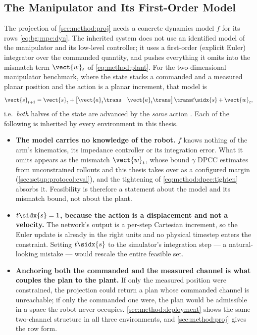 \subsection{The Manipulator and Its First-Order Model}\label{sec:method:manipulator}

The projection of \autoref{sec:method:proj} needs a concrete dynamics model $f$ for its rows
\eqref{eq:bg:mpc:dyn}. The inherited system does not use an identified
model of the manipulator and its low-level controller; it uses a first-order (explicit Euler)
integrator over the commanded quantity, and pushes everything it omits into the mismatch term
$\vect{w}_{t}$ of \eqref{eq:method:plant}. For the two-dimensional manipulator benchmark, where the
state stacks a commanded and a measured planar position and the action is a planar increment, that
model is
\begin{equation}\label{eq:method:dpcc:euler}
  \vect{s}_{t+1}
  = \vect{s}_{t} + \begin{bmatrix}\vect{a}_{t}\trans & \vect{a}_{t}\trans\end{bmatrix}\trans t\sidx{s}
    + \vect{w}_{t},
\end{equation}
i.e.\ \emph{both} halves of the state are advanced by the \emph{same} action
\parencite[Sec.~6.1]{romer2025diffusion}. Each of the following is inherited by every
environment in this thesis.

\begin{itemize}
  \item \textbf{The model carries no knowledge of the robot.} $f$ knows nothing of the arm's
    kinematics, its impedance controller or its integration error. What it omits appears as the
    mismatch $\vect{w}_{t}$, whose bound $\gamma$ \ac{DPCC} estimates from unconstrained rollouts and this
    thesis takes over as a configured margin (\autoref{sec:setup:protocol:eval}), and the
    tightening of \eqref{eq:method:dpcc:tighten} absorbs it. Feasibility is therefore a statement
    about the model and its mismatch bound, not about the plant.
  \item \textbf{$t\sidx{s} = 1$, because the action is a displacement and not a velocity.} The
    network's output is a per-step Cartesian increment, so the Euler update is already in the right
    units and no physical timestep enters the constraint. Setting $t\sidx{s}$ to the simulator's
    integration step --- a natural-looking mistake --- would rescale the entire feasible set.
  \item \textbf{Anchoring both the commanded and the measured channel is what couples the plan to
    the plant.} If only the measured position were constrained, the projection could return a plan
    whose commanded channel is unreachable; if only the commanded one were, the plan would be
    admissible in a space the robot never occupies. \autoref{sec:method:deployment} shows the same
    two-channel structure in all three environments, and \autoref{sec:method:proj} gives the row form.
\end{itemize}

